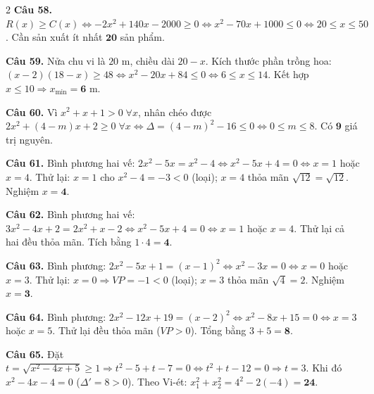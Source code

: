 \documentclass[12pt,a4paper]{article}
\begin{document}
\begin{multicols}{2}
\textbf{Câu 58.} $R(x) \ge C(x) \Leftrightarrow -2x^2 + 140x - 2000 \ge 0 \Leftrightarrow x^2 - 70x + 1000 \le 0 \Leftrightarrow 20 \le x \le 50$. Cần sản xuất ít nhất $\mathbf{20}$ sản phẩm.\par\vspace{3pt}

\textbf{Câu 59.} Nửa chu vi là $20\text{ m}$, chiều dài $20 - x$. Kích thước phần trồng hoa: $(x - 2)(18 - x) \ge 48 \Leftrightarrow x^2 - 20x + 84 \le 0 \Leftrightarrow 6 \le x \le 14$. Kết hợp $x \le 10 \Rightarrow x_{\min} = \mathbf{6}\text{ m}$.\par\vspace{3pt}

\textbf{Câu 60.} Vì $x^2 + x + 1 > 0\;\forall x$, nhân chéo được $2x^2 + (4 - m)x + 2 \ge 0\;\forall x \Leftrightarrow \Delta = (4 - m)^2 - 16 \le 0 \Leftrightarrow 0 \le m \le 8$. Có $\mathbf{9}$ giá trị nguyên.\par\vspace{3pt}

\textbf{Câu 61.} Bình phương hai vế: $2x^2 - 5x = x^2 - 4 \Leftrightarrow x^2 - 5x + 4 = 0 \Leftrightarrow x = 1$ hoặc $x = 4$. Thử lại: $x = 1$ cho $x^2 - 4 = -3 < 0$ (loại); $x = 4$ thỏa mãn $\sqrt{12} = \sqrt{12}$. Nghiệm $x = \mathbf{4}$.\par\vspace{3pt}

\textbf{Câu 62.} Bình phương hai vế: $3x^2 - 4x + 2 = 2x^2 + x - 2 \Leftrightarrow x^2 - 5x + 4 = 0 \Leftrightarrow x = 1$ hoặc $x = 4$. Thử lại cả hai đều thỏa mãn. Tích bằng $1 \cdot 4 = \mathbf{4}$.\par\vspace{3pt}

\textbf{Câu 63.} Bình phương: $2x^2 - 5x + 1 = (x - 1)^2 \Leftrightarrow x^2 - 3x = 0 \Leftrightarrow x = 0$ hoặc $x = 3$. Thử lại: $x = 0 \Rightarrow VP = -1 < 0$ (loại); $x = 3$ thỏa mãn $\sqrt{4} = 2$. Nghiệm $x = \mathbf{3}$.\par\vspace{3pt}

\textbf{Câu 64.} Bình phương: $2x^2 - 12x + 19 = (x - 2)^2 \Leftrightarrow x^2 - 8x + 15 = 0 \Leftrightarrow x = 3$ hoặc $x = 5$. Thử lại đều thỏa mãn ($VP > 0$). Tổng bằng $3 + 5 = \mathbf{8}$.\par\vspace{3pt}

\textbf{Câu 65.} Đặt $t = \sqrt{x^2 - 4x + 5} \ge 1 \Rightarrow t^2 - 5 + t - 7 = 0 \Leftrightarrow t^2 + t - 12 = 0 \Rightarrow t = 3$. Khi đó $x^2 - 4x - 4 = 0$ ($\Delta' = 8 > 0$). Theo Vi-ét: $x_1^2 + x_2^2 = 4^2 - 2(-4) = \mathbf{24}$.\par\vspace{3pt}


\end{multicols}
\end{document}
